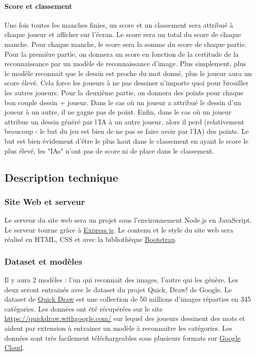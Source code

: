 \documentclass{article}
\begin{document}
\paragraph{Score et classement} Une fois toutes les manches finies, un score et un classement sera attribué à chaque joueur et afficher sur l'écran. Le score sera un total du score de chaque manche. Pour chaque manche, le score sera la somme du score de chaque partie. Pour la première partie, on donnera un score en fonction de la certitude de la reconnaissance par un modèle de reconnaissance d'image. Plus simplement, plus le modèle reconnait que le dessin est proche du mot donné, plus le joueur aura un score élevé. Cela force les joueurs à ne pas dessiner n'importe quoi pour brouiller les autres joueurs. Pour la deuxième partie, on donnera des points pour chaque bon couple dessin + joueur. Dans le cas où un joueur a attribué le dessin d'un joueur à un autre, il ne gagne pas de point. Enfin, dans le cas où un joueur attribue un dessin généré par l'IA à un autre joueur, alors il perd (relativement beaucoup - le but du jeu est bien de ne pas se faire avoir par l'IA) des points. Le but est bien évidement d'être le plus haut dans le classement en ayant le score le plus élevé, les "IAs" n'ont pas de score ni de place dans le classement.

\subsection{Description technique}

\subsubsection{Site Web et serveur}

Le serveur du site web sera un projet sous l'environnement Node.js en JavaScript. Le serveur tourne grâce à \href{https://expressjs.com/}{Express.js}. Le contenu et le style du site web sera réalisé en HTML, CSS et avec la bibliothèque \href{https://getbootstrap.com/}{Bootstrap}.

\subsubsection{Dataset et modèles}

Il y aura 2 modèles : l'un qui reconnait des images, l'autre qui les génère. Les deux seront entrainés avec le dataset du projet Quick, Draw! de Google. Le  dataset de \href{https://github.com/googlecreativelab/quickdraw-dataset}{Quick Draw} est une collection de 50 millions d'images réparties en 345 catégories. Les données ont été récupérées sur le site \url{https://quickdraw.withgoogle.com/} sur lequel des joueurs dessinent des mots et aident par extension à entrainer un modèle à reconnaitre les catégories. Les données sont très facilement téléchargeables sous plusieurs formats sur \href{https://console.cloud.google.com/storage/browser/quickdraw_dataset}{Google Cloud}.
\end{document}
